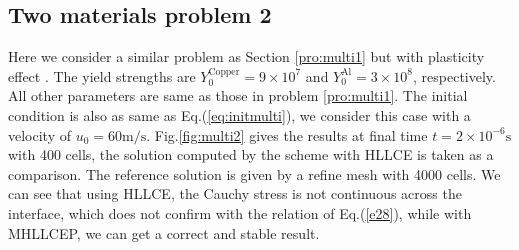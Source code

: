 \documentclass[review]{elsarticle}
\begin{document}

\subsection{Two materials problem 2}
Here we consider a similar problem as Section \ref{pro:multi1} but with plasticity effect . The yield strengths are $Y_0^{\text{Copper}} = 9\times 10^7$ and $Y_0^{\text{Al}} = 3\times 10^8$, respectively. All other  parameters are same as those in problem \ref{pro:multi1}. The initial condition is also as  same as  Eq.(\ref{eq:initmulti}), we consider this case with a velocity of $u_0 = 60 \text{m}/\text{s}$.
Fig.\ref{fig:multi2} gives the results at final time $ t= 2 \times 10^{-6} \text{s}$ with 400 cells, the solution computed by the scheme with HLLCE is taken as a comparison. The reference solution is given by a refine mesh with 4000 cells. We can see that using HLLCE, the Cauchy stress is not continuous across the interface, which does not confirm with the relation of Eq.(\ref{e28}), while with MHLLCEP, we can get a correct and stable result.
%
%
\end{document}

